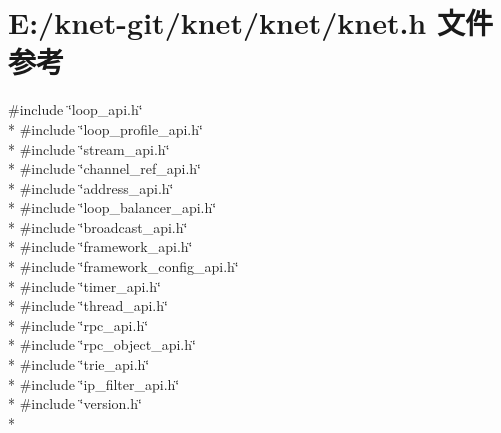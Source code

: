 \hypertarget{a00069}{}\section{E\+:/knet-\/git/knet/knet/knet.h 文件参考}
\label{a00069}
{\ttfamily \#include \char`\"{}loop\+\_\+api.\+h\char`\"{}}\\*
{\ttfamily \#include \char`\"{}loop\+\_\+profile\+\_\+api.\+h\char`\"{}}\\*
{\ttfamily \#include \char`\"{}stream\+\_\+api.\+h\char`\"{}}\\*
{\ttfamily \#include \char`\"{}channel\+\_\+ref\+\_\+api.\+h\char`\"{}}\\*
{\ttfamily \#include \char`\"{}address\+\_\+api.\+h\char`\"{}}\\*
{\ttfamily \#include \char`\"{}loop\+\_\+balancer\+\_\+api.\+h\char`\"{}}\\*
{\ttfamily \#include \char`\"{}broadcast\+\_\+api.\+h\char`\"{}}\\*
{\ttfamily \#include \char`\"{}framework\+\_\+api.\+h\char`\"{}}\\*
{\ttfamily \#include \char`\"{}framework\+\_\+config\+\_\+api.\+h\char`\"{}}\\*
{\ttfamily \#include \char`\"{}timer\+\_\+api.\+h\char`\"{}}\\*
{\ttfamily \#include \char`\"{}thread\+\_\+api.\+h\char`\"{}}\\*
{\ttfamily \#include \char`\"{}rpc\+\_\+api.\+h\char`\"{}}\\*
{\ttfamily \#include \char`\"{}rpc\+\_\+object\+\_\+api.\+h\char`\"{}}\\*
{\ttfamily \#include \char`\"{}trie\+\_\+api.\+h\char`\"{}}\\*
{\ttfamily \#include \char`\"{}ip\+\_\+filter\+\_\+api.\+h\char`\"{}}\\*
{\ttfamily \#include \char`\"{}version.\+h\char`\"{}}\\*
